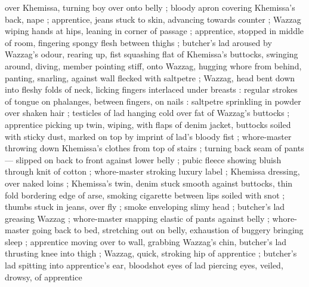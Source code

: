 over Khemissa, turning boy over onto belly ; bloody apron covering Khemissa's back, nape ; apprentice, jeans stuck to skin, advancing towards counter ; Wazzag wiping hands at hips, leaning in corner of passage ; apprentice, stopped in middle of room, fingering spongy flesh between thighs ; butcher's lad aroused by Wazzag's odour, rearing up, fist squashing flat of Khemissa's buttocks, swinging around, diving, member pointing stiff, onto Wazzag, hugging whore from behind, panting, snarling, against wall flecked with saltpetre ; Wazzag, head bent down into fleshy folds of neck, licking fingers interlaced under breasts : regular strokes of tongue on phalanges, between fingers, on nails : saltpetre sprinkling in powder over shaken hair ; testicles of lad hanging cold over fat of Wazzag's buttocks ; apprentice picking up twin, wiping, with flaps of denim jacket, buttocks soiled with sticky dust, marked on top by imprint of lad's bloody fist ; whore-master throwing down Khemissa's clothes from top of stairs ; turning back seam of pants --- slipped on back to front {\dashcom} against lower belly ; pubic fleece showing bluish through knit of cotton ; whore-master stroking luxury label ; Khemissa dressing, over naked loins ; Khemissa's twin, denim stuck smooth against buttocks, thin fold bordering edge of arse, smoking cigarette between lips soiled with snot ; thumbs stuck in jeans, over fly ; smoke enveloping slimy head ; butcher's lad greasing Wazzag ; whore-master snapping elastic of pants against belly  ; whore-master going back to bed, stretching out on belly, exhaustion of buggery bringing sleep ; apprentice moving over to wall, grabbing Wazzag's chin, butcher's lad thrusting knee into thigh ; Wazzag, quick, stroking hip of apprentice ; butcher's lad spitting into apprentice's ear, bloodshot eyes of lad piercing eyes, veiled, drowsy, of apprentice 

